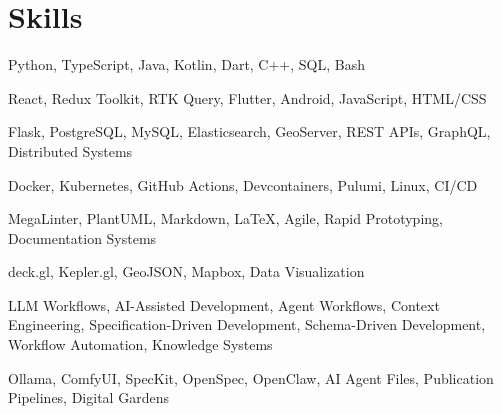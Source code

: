 %

\section{Skills}

{Python, TypeScript, Java, Kotlin, Dart, C++, SQL, Bash}

{React, Redux Toolkit, RTK Query, Flutter, Android, JavaScript, HTML/CSS}

{Flask, PostgreSQL, MySQL, Elasticsearch, GeoServer, REST APIs, GraphQL, Distributed Systems}

{Docker, Kubernetes, GitHub Actions, Devcontainers, Pulumi, Linux, CI/CD}

{MegaLinter, PlantUML, Markdown, LaTeX, Agile, Rapid Prototyping, Documentation Systems}

{deck.gl, Kepler.gl, GeoJSON, Mapbox, Data Visualization}

{LLM Workflows, AI-Assisted Development, Agent Workflows, Context Engineering, Specification-Driven Development, Schema-Driven Development, Workflow Automation, Knowledge Systems}

{Ollama, ComfyUI, SpecKit, OpenSpec, OpenClaw, AI Agent Files, Publication Pipelines, Digital Gardens}
